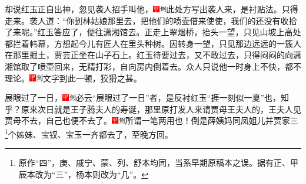却说红玉正自出神，忽见袭人招手叫他，{\includegraphics[width=3mm]{../Images/00002}\includegraphics[width=3mm]{../Images/00011}\footnotesize \kaishu 此处方写出袭人来，是衬贴法。}只得走来。袭人道：“你到林姑娘那里去，把他们的喷壶借来使使，我们的还没有收拾了来呢。”红玉答应了，便往潇湘馆去。正走上翠烟桥，抬头一望，只见山坡上高处都拦着帏幕，方想起今儿有匠人在里头种树。因转身一望，只见那边远远的一簇人在那里掘土，贾芸正坐在山子石上。红玉待要过去，又不敢过去，只得闷闷的向潇湘馆取了喷壶回来，无精打彩，自向房内倒着去。众人只说他一时身上不快，都不理论。{\includegraphics[width=3mm]{../Images/00002}\includegraphics[width=3mm]{../Images/00011}\footnotesize \kaishu 文字到此一顿，狡猾之甚。}

展眼过了一日，{\includegraphics[width=3mm]{../Images/00002}\includegraphics[width=3mm]{../Images/00011}\footnotesize \kaishu 必云“展眼过了一日”者，是反衬红玉“捱一刻似一夏”也，知乎？}原来次日就是王子腾夫人的寿诞，那里原打发人来请贾母王夫人的，王夫人见贾母不去，自己也便不去了。{\includegraphics[width=3mm]{../Images/00002}\includegraphics[width=3mm]{../Images/00011}\footnotesize \kaishu 所谓一笔两用也！}倒是薛姨妈同凤姐儿并贾家三\footnote{原作“四”，庚、戚宁、蒙、列、舒本均同，当系早期原稿本之误。据有正、甲辰本改为“三”，杨本则改为“几”。}个姊妹、宝钗、宝玉一齐都去了，至晚方回。

